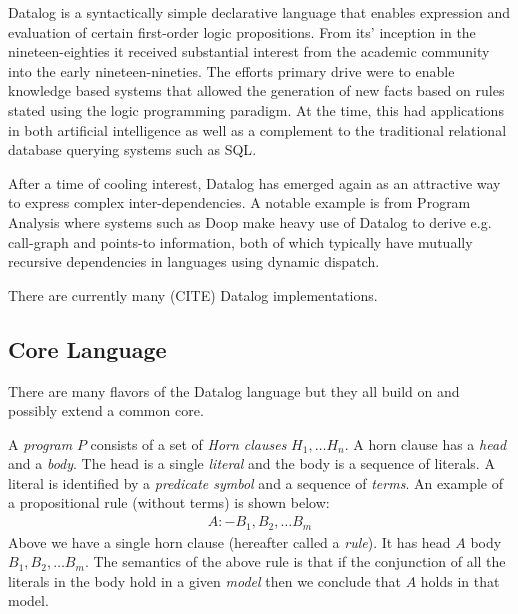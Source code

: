 Datalog is a syntactically simple declarative language that enables expression and evaluation of certain first-order logic propositions. From its' inception in the nineteen-eighties it received substantial interest from the academic community into the early nineteen-nineties\cite{Green:2013:DRQ:2688167.2688168}. The efforts primary drive were to enable knowledge based systems that allowed the generation of new facts based on rules stated using the logic programming paradigm. At the time, this had applications in both artificial intelligence as well as a complement to the traditional relational database querying systems such as SQL\cite{Ceri:1989:YAW:627272.627357}\cite{Bancilhon:1986:AIR:16894.16859}.

\NL
After a time of cooling interest, Datalog has emerged again as an attractive way to express complex inter-dependencies\cite{Green:2013:DRQ:2688167.2688168}. A notable example is from Program Analysis where systems such as Doop \cite{Smaragdakis:2010:UDF:2185923.2185939} make heavy use of Datalog to derive e.g. call-graph and points-to information, both of which typically have mutually recursive dependencies in languages using dynamic dispatch.

\NL
There are currently many (CITE) Datalog implementations.

\subsection{Core Language}
There are many flavors of the Datalog language but they all build on and possibly extend a common core. 

\NL
A \textit{program} $P$ consists of a set of \textit{Horn clauses} $H_1, \ldots H_n$. A horn clause has a \textit{head} and a \textit{body}. The head is a single \textit{literal} and the body is a sequence of literals. A literal is identified by a \textit{predicate symbol} and a sequence of \textit{terms}. An example of a propositional rule (without terms) is shown below:
\begin{align*}
A :- B_1, B_2, \ldots B_m
\end{align*}
\noindent
Above we have a single horn clause (hereafter called a \textit{rule}). It has head $A$ body $B_1, B_2, \ldots B_m$. The semantics of the above rule is that if the conjunction of all the literals in the body hold in a given \textit{model} then we conclude that $A$ holds in that model.

